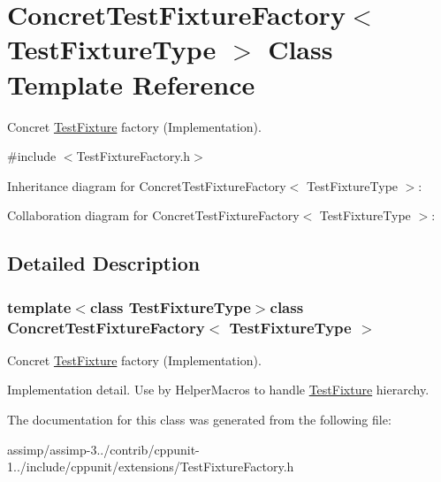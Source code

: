 \hypertarget{class_concret_test_fixture_factory}{\section{Concret\+Test\+Fixture\+Factory$<$ Test\+Fixture\+Type $>$ Class Template Reference}
\label{class_concret_test_fixture_factory}
}


Concret \hyperlink{class_test_fixture}{Test\+Fixture} factory (Implementation).  




{\ttfamily \#include $<$Test\+Fixture\+Factory.\+h$>$}



Inheritance diagram for Concret\+Test\+Fixture\+Factory$<$ Test\+Fixture\+Type $>$\+:


Collaboration diagram for Concret\+Test\+Fixture\+Factory$<$ Test\+Fixture\+Type $>$\+:


\subsection{Detailed Description}
\subsubsection*{template$<$class Test\+Fixture\+Type$>$class Concret\+Test\+Fixture\+Factory$<$ Test\+Fixture\+Type $>$}

Concret \hyperlink{class_test_fixture}{Test\+Fixture} factory (Implementation). 

Implementation detail. Use by Helper\+Macros to handle \hyperlink{class_test_fixture}{Test\+Fixture} hierarchy. 

The documentation for this class was generated from the following file\+:\begin{DoxyCompactItemize}
\item 
assimp/assimp-\/3../contrib/cppunit-\/1../include/cppunit/extensions/Test\+Fixture\+Factory.\+h\end{DoxyCompactItemize}
